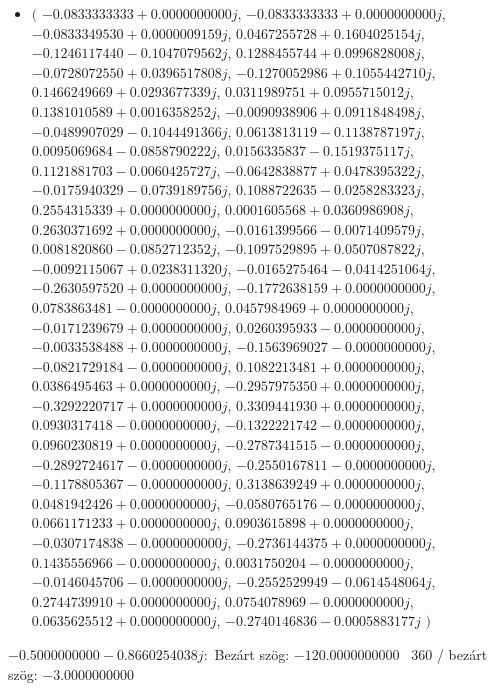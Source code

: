 \documentclass[14pt,a4paper]{article}
\begin{document}
\begin{itemize}
\item
$\big($
$-0.0833333333+0.0000000000j$, $-0.0833333333+0.0000000000j$, $-0.0833349530+0.0000009159j$, $0.0467255728+0.1604025154j$, $-0.1246117440-0.1047079562j$, $0.1288455744+0.0996828008j$, $-0.0728072550+0.0396517808j$, $-0.1270052986+0.1055442710j$, $0.1466249669+0.0293677339j$, $0.0311989751+0.0955715012j$, $0.1381010589+0.0016358252j$, $-0.0090938906+0.0911848498j$, $-0.0489907029-0.1044491366j$, $0.0613813119-0.1138787197j$, $0.0095069684-0.0858790222j$, $0.0156335837-0.1519375117j$, $0.1121881703-0.0060425727j$, $-0.0642838877+0.0478395322j$, $-0.0175940329-0.0739189756j$, $0.1088722635-0.0258283323j$, $0.2554315339+0.0000000000j$, $0.0001605568+0.0360986908j$, $0.2630371692+0.0000000000j$, $-0.0161399566-0.0071409579j$, $0.0081820860-0.0852712352j$, $-0.1097529895+0.0507087822j$, $-0.0092115067+0.0238311320j$, $-0.0165275464-0.0414251064j$, $-0.2630597520+0.0000000000j$, $-0.1772638159+0.0000000000j$, $0.0783863481-0.0000000000j$, $0.0457984969+0.0000000000j$, $-0.0171239679+0.0000000000j$, $0.0260395933-0.0000000000j$, $-0.0033538488+0.0000000000j$, $-0.1563969027-0.0000000000j$, $-0.0821729184-0.0000000000j$, $0.1082213481+0.0000000000j$, $0.0386495463+0.0000000000j$, $-0.2957975350+0.0000000000j$, $-0.3292220717+0.0000000000j$, $0.3309441930+0.0000000000j$, $0.0930317418-0.0000000000j$, $-0.1322221742-0.0000000000j$, $0.0960230819+0.0000000000j$, $-0.2787341515-0.0000000000j$, $-0.2892724617-0.0000000000j$, $-0.2550167811-0.0000000000j$, $-0.1178805367-0.0000000000j$, $0.3138639249+0.0000000000j$, $0.0481942426+0.0000000000j$, $-0.0580765176-0.0000000000j$, $0.0661171233+0.0000000000j$, $0.0903615898+0.0000000000j$, $-0.0307174838-0.0000000000j$, $-0.2736144375+0.0000000000j$, $0.1435556966-0.0000000000j$, $0.0031750204-0.0000000000j$, $-0.0146045706-0.0000000000j$, $-0.2552529949-0.0614548064j$, $0.2744739910+0.0000000000j$, $0.0754078969-0.0000000000j$, $0.0635625512+0.0000000000j$, $-0.2740146836-0.0005883177j$
$\big)$
\end{itemize}
$-0.5000000000-0.8660254038j$:\
Bezárt szög: $-120.0000000000$ \
360 / bezárt szög: $-3.0000000000$\
\end{document}
